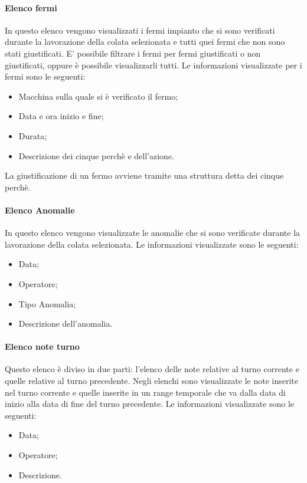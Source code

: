   \paragraph{Elenco fermi}
  In questo elenco vengono visualizzati i fermi impianto che si sono verificati durante la lavorazione della colata selezionata e 
  tutti quei fermi che non sono stati giustificati. E' possibile filtrare i fermi per fermi giustificati 
  o non giustificati, oppure è possibile visualizzarli tutti. Le informazioni visualizzate per i fermi 
  sono le seguenti:
  \begin{itemize}
    \item Macchina sulla quale si è verificato il fermo;
    \item Data e ora inizio e fine;
    \item Durata;
    \item Descrizione dei cinque perchè e dell’azione.
  \end{itemize}
  La giustificazione di un fermo avviene tramite una struttura detta dei cinque perchè.


  \paragraph{Elenco Anomalie}
  In questo elenco vengono visualizzate le anomalie che si sono verificate durante la lavorazione della colata 
  selezionata. Le informazioni visualizzate sono le seguenti:
  \begin{itemize}
    \item Data;
    \item Operatore;
    \item Tipo Anomalia;
    \item Descrizione dell'anomalia.
  \end{itemize} 
  
  \paragraph{Elenco note turno}
  Questo elenco è diviso in due parti: l'elenco delle note relative al turno corrente e quelle relative al 
  turno precedente. Negli elenchi sono visualizzate le note inserite nel turno corrente e quelle inserite 
  in un range temporale che va dalla data di inizio alla data di fine del turno precedente. 
  Le informazioni visualizzate sono le seguenti:
  \begin{itemize}
    \item Data;
    \item Operatore;
    \item Descrizione.
  \end{itemize}   


